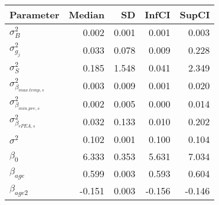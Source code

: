 \begin{table}[ht]
\centering
\begin{tabular}{lrrrr}
  \hline
Parameter & Median & SD & InfCI & SupCI \\ 
  \hline
$\sigma^{2}_{B}$ & 0.002 & 0.001 & 0.001 & 0.003 \\ 
  $\sigma^{2}_{g_{j}}$ & 0.033 & 0.078 & 0.009 & 0.228 \\ 
  $\sigma^{2}_{S}$ & 0.185 & 1.548 & 0.041 & 2.349 \\ 
  $\sigma^{2}_{\beta_{max.temp,s}}$ & 0.003 & 0.009 & 0.001 & 0.020 \\ 
  $\sigma^{2}_{\beta_{min.pre,s}}$ & 0.002 & 0.005 & 0.000 & 0.014 \\ 
  $\sigma^{2}_{\beta_{rPEA,s}}$ & 0.032 & 0.133 & 0.010 & 0.202 \\ 
  $\sigma^{2}$ & 0.102 & 0.001 & 0.100 & 0.104 \\ 
  $\beta_{0}$ & 6.333 & 0.353 & 5.631 & 7.034 \\ 
  $\beta_{age}$ & 0.599 & 0.003 & 0.593 & 0.604 \\ 
  $\beta_{age2}$ & -0.151 & 0.003 & -0.156 & -0.146 \\ 
   \hline
\end{tabular}
\end{table}
